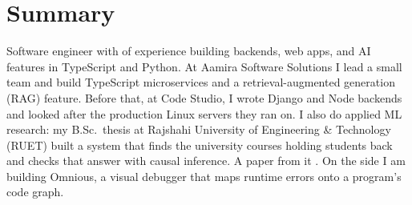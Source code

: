 \documentclass[10pt, a4paper]{article}
\begin{document}
\color{primary}
\cvheader

\section{Summary}
Software engineer with \factExpYears{} of experience building backends, web apps, and AI features in TypeScript and Python. At Aamira Software Solutions I lead a small team and build TypeScript microservices and a retrieval-augmented generation (RAG) feature. Before that, at Code Studio, I wrote Django and Node backends and looked after the production Linux servers they ran on. I also do applied ML research: my B.Sc.\ thesis at Rajshahi University of Engineering \& Technology (RUET) built a system that finds the university courses holding students back and checks that answer with causal inference. A paper from it \factLakIs{}. On the side I am building Omnious, a visual debugger that maps runtime errors onto a program's code graph.



\end{document}
